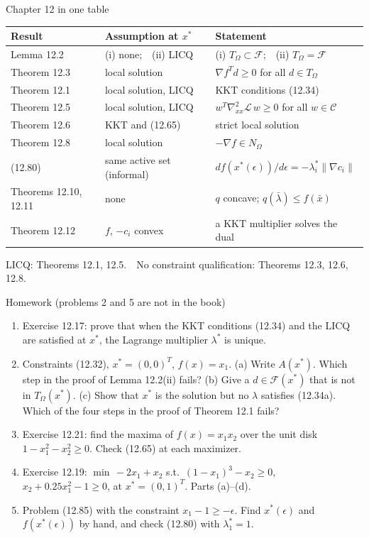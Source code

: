 \documentclass[aspectratio=169,12pt]{beamer}
\newcommand{\xs}{x^{*}}
\newcommand{\gradf}{\nabla f}
\newcommand{\ls}{\lambda^{*}}
\newcommand{\cC}{\mathcal{C}}
\newcommand{\cF}{\mathcal{F}}
\newcommand{\cL}{\mathcal{L}}
\newcommand{\TO}{T_{\Omega}}
\newcommand{\NO}{N_{\Omega}}
\newcommand{\hessL}{\nabla_{xx}^{2}\cL}
\begin{document}
\begin{frame}{Chapter 12 in one table}
  \begin{center}\small\setlength\tabcolsep{5pt}
  \renewcommand{\arraystretch}{1.08}
  \begin{tabular}{lll}
    \toprule
    Result & Assumption at $\xs$ & Statement \\
    \midrule
    Lemma 12.2 & (i) none;\ \ (ii) LICQ & (i) $\TO\subset\cF$;\ \ (ii) $\TO=\cF$ \\
    Theorem 12.3 & local solution & $\gradf^{T}d\ge 0$ for all $d\in\TO$ \\
    Theorem 12.1 & local solution, LICQ & KKT conditions (12.34) \\
    Theorem 12.5 & local solution, LICQ & $w^{T}\hessL\,w\ge 0$ for all $w\in\cC$ \\
    Theorem 12.6 & KKT and (12.65) & strict local solution \\
    Theorem 12.8 & local solution & $-\gradf\in\NO$ \\
    (12.80) & same active set (informal) & $df(\xs(\epsilon))/d\epsilon=-\ls_{i}\|\nabla c_{i}\|$ \\
    Theorems 12.10, 12.11 & none & $q$ concave; $q(\bar\lambda)\le f(\bar x)$ \\
    Theorem 12.12 & $f$, $-c_{i}$ convex & a KKT multiplier solves the dual \\
    \bottomrule
  \end{tabular}
  \end{center}
  LICQ: Theorems 12.1, 12.5.\ \ No constraint qualification: Theorems 12.3, 12.6, 12.8.
\end{frame}

\begin{frame}{Homework {\normalfont\small(problems 2 and 5 are not in the book)}}
  \begin{enumerate}\setlength\itemsep{0.45em}
    \item Exercise 12.17: prove that when the KKT conditions (12.34) and the LICQ are satisfied at
      $\xs$, the Lagrange multiplier $\ls$ is unique.
    \item Constraints (12.32), $\xs=(0,0)^{T}$, $f(x)=x_{1}$. (a) Write $A(\xs)$. Which step in the
      proof of Lemma 12.2(ii) fails? (b) Give a $d\in\cF(\xs)$ that is not in $\TO(\xs)$.
      (c) Show that $\xs$ is the solution but no $\lambda$ satisfies (12.34a). Which of the four steps
      in the proof of Theorem 12.1 fails?
    \item Exercise 12.21: find the maxima of $f(x)=x_{1}x_{2}$ over the unit disk
      $1-x_{1}^{2}-x_{2}^{2}\ge 0$. Check (12.65) at each maximizer.
    \item Exercise 12.19: $\min\,-2x_{1}+x_{2}$ s.t.\ $(1-x_{1})^{3}-x_{2}\ge 0$,
      $x_{2}+0.25x_{1}^{2}-1\ge 0$, at $\xs=(0,1)^{T}$. Parts (a)--(d).
    \item Problem (12.85) with the constraint $x_{1}-1\ge-\epsilon$. Find $\xs(\epsilon)$ and
      $f(\xs(\epsilon))$ by hand, and check (12.80) with $\ls_{1}=1$.
  \end{enumerate}
\end{frame}
\end{document}
